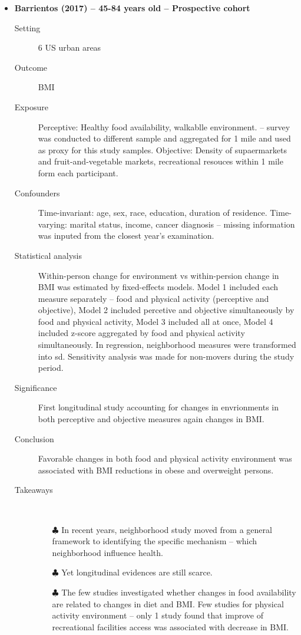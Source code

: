 \documentclass{article}
\begin{document}
\begin{itemize}
\newpage
    \item {\bf Barrientos (2017)  -- 45-84 years old -- Prospective cohort}
		\begin{description}
			\item[Setting] 6 US urban areas
			\item[Outcome] BMI
			\item[Exposure] Perceptive: Healthy food availability, walkablle environment. -- survey was conducted to different sample and aggregated for 1 mile and used as proxy for this study samples. Objective: Density of supaermarkets and fruit-and-vegetable markets, recreational resouces within 1 mile form each participant.
			\item[Confounders] Time-invariant: age, sex, race, education, duration of residence. Time-varying: marital status, income, cancer diagnosis -- missing information was inputed from the closest year's examination.  
			\item[Statistical analysis] Within-person change for environment vs within-persion change in BMI was estimated by fixed-effects models. Model 1 included each measure separately -- food and physical activity (perceptive and objective), Model 2 included  percetive and objective simultaneously by food and physical activity, Model 3 included all at once, Model 4 included z-score aggregated by food and physical activity simultaneously. In regression, neighborhood measures were transformed into sd. Sensitivity analysis was made for non-movers during the study period.
    			\item[Significance] First longitudinal study accounting for changes in envrionments in both perceptive and objective measures again changes in BMI. 
    			\item[Conclusion] Favorable changes in both food and physical activity environment  was associated with BMI reductions in obese and overweight persons.
    			\item[Takeaways] \mbox{}\\ 
    				\begin{itemize}
    					\item[$\clubsuit$] In recent years, neighborhood study moved from a general framework to identifying the specific mechanism -- which neighborhood influence health.
    					\item[$\clubsuit$] Yet longitudinal evidences are still scarce.
    					\item[$\clubsuit$] The few studies investigated whether changes in food availability are related to changes in diet and BMI. Few studies for physical activity environment -- only 1 study found that improve of recreational facilities access was associated with decrease in BMI. 
				\end{itemize}
    		\end{description}


\end{itemize}
\end{document}

